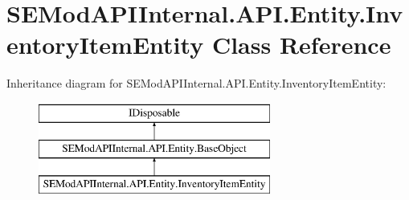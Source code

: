 \hypertarget{class_s_e_mod_a_p_i_internal_1_1_a_p_i_1_1_entity_1_1_inventory_item_entity}{}\section{S\+E\+Mod\+A\+P\+I\+Internal.\+A\+P\+I.\+Entity.\+Inventory\+Item\+Entity Class Reference}
\label{class_s_e_mod_a_p_i_internal_1_1_a_p_i_1_1_entity_1_1_inventory_item_entity}
Inheritance diagram for S\+E\+Mod\+A\+P\+I\+Internal.\+A\+P\+I.\+Entity.\+Inventory\+Item\+Entity\+:\begin{figure}[H]
\begin{center}
\leavevmode
\includegraphics[height=3.000000cm]{class_s_e_mod_a_p_i_internal_1_1_a_p_i_1_1_entity_1_1_inventory_item_entity}
\end{center}
\end{figure}
